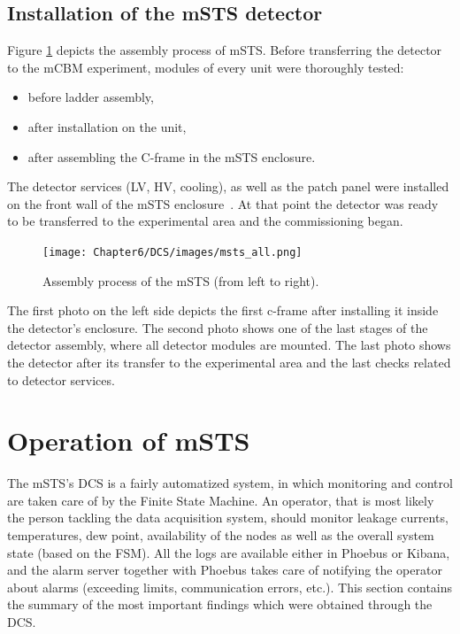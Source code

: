 \subsection{Installation of the mSTS detector}
Figure \ref{fig_msts_state} depicts the assembly process of \gls{mSTS}. Before transferring the detector to the \gls{mCBM} experiment, modules of every unit were thoroughly tested:
\begin{itemize}
    \item before ladder assembly,
    \item after installation on the unit,
    \item after assembling the C-frame in the mSTS enclosure.
\end{itemize}
The detector services (\gls{LV}, \gls{HV}, cooling), as well as the patch panel were installed on the front wall of the \gls{mSTS} enclosure~\cite{tekli1}. At that point the detector was ready to be transferred to the experimental area and the commissioning began.

\begin{figure}[h!]
\centering
\texttt{[image: Chapter6/DCS/images/msts\_all.png]}
\caption{Assembly process of the \gls{mSTS} (from left to right).}
\label{fig_msts_state}
\end{figure}
 The first photo on the left side depicts the first c-frame after installing it inside the detector's enclosure. The second photo shows one of the last stages of the detector assembly, where all detector modules are mounted. The last photo shows the detector after its transfer to the experimental area and the last checks related to detector services. %

\section{Operation of mSTS}

The \gls{mSTS}'s \gls{DCS} is a fairly automatized system, in which monitoring and control are taken care of by the Finite State Machine. An operator, that is most likely the person tackling the data acquisition system, should monitor leakage currents, temperatures, dew point, availability of the nodes as well as the overall system state (based on the \gls{FSM}). All the logs are available either in Phoebus or Kibana, and the alarm server together with Phoebus takes care of notifying the operator about alarms (exceeding limits, communication errors, etc.). This section contains the summary of the most important findings which were obtained through the \gls{DCS}. 



